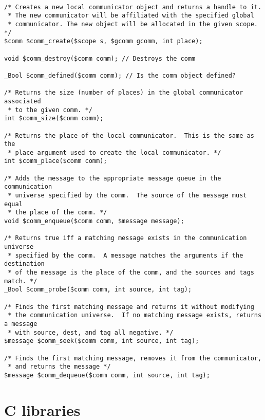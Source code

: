 \begin{verbatim}

/* Creates a new local communicator object and returns a handle to it.
 * The new communicator will be affiliated with the specified global
 * communicator. The new object will be allocated in the given scope. */
$comm $comm_create($scope s, $gcomm gcomm, int place);

void $comm_destroy($comm comm); // Destroys the comm

_Bool $comm_defined($comm comm); // Is the comm object defined?

/* Returns the size (number of places) in the global communicator associated
 * to the given comm. */
int $comm_size($comm comm);

/* Returns the place of the local communicator.  This is the same as the
 * place argument used to create the local communicator. */
int $comm_place($comm comm);

/* Adds the message to the appropriate message queue in the communication
 * universe specified by the comm.  The source of the message must equal
 * the place of the comm. */
void $comm_enqueue($comm comm, $message message);

/* Returns true iff a matching message exists in the communication universe
 * specified by the comm.  A message matches the arguments if the destination
 * of the message is the place of the comm, and the sources and tags match. */
_Bool $comm_probe($comm comm, int source, int tag);

/* Finds the first matching message and returns it without modifying
 * the communication universe.  If no matching message exists, returns a message
 * with source, dest, and tag all negative. */
$message $comm_seek($comm comm, int source, int tag);

/* Finds the first matching message, removes it from the communicator,
 * and returns the message */ 
$message $comm_dequeue($comm comm, int source, int tag);
\end{verbatim}

\section{C libraries}

